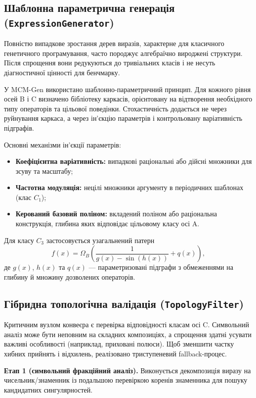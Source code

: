 \documentclass[11pt]{article}
\begin{document}
\subsection{Шаблонна параметрична генерація (\texttt{ExpressionGenerator})}

Повністю випадкове зростання дерев виразів, характерне для класичного генетичного програмування, часто породжує алгебраїчно вироджені структури. Після спрощення вони редукуються до тривіальних класів і не несуть діагностичної цінності для бенчмарку.

У MCM-Gen використано шаблонно-параметричний принцип. Для кожного рівня осей B і C визначено бібліотеку каркасів, орієнтовану на відтворення необхідного типу операторів та цільової поведінки. Стохастичність додається не через руйнування каркаса, а через ін'єкцію параметрів і контрольовану варіативність підграфів.

Основні механізми ін'єкції параметрів:
\begin{itemize}[leftmargin=1.5em]
  \item \textbf{Коефіцієнтна варіативність:} випадкові раціональні або дійсні множники для зсуву та масштабу;
  \item \textbf{Частотна модуляція:} нецілі множники аргументу в періодичних шаблонах (клас $C_1$);
  \item \textbf{Керований базовий поліном:} вкладений поліном або раціональна конструкція, глибина яких відповідає цільовому класу осі A.
\end{itemize}

Для класу $C_3$ застосовується узагальнений патерн
\[
f(x)=\Omega_B\!\left(\frac{1}{g(x)-\sin(h(x))}+q(x)\right),
\]
де $g(x)$, $h(x)$ та $q(x)$ --- параметризовані підграфи з обмеженнями на глибину й множину дозволених операторів.

\subsection{Гібридна топологічна валідація (\texttt{TopologyFilter})}

Критичним вузлом конвеєра є перевірка відповідності класам осі C. Символьний аналіз може бути неповним на складних композиціях, а спрощення здатні усувати важливі особливості (наприклад, приховані полюси). Щоб зменшити частку хибних прийнять і відхилень, реалізовано триступеневий fallback-процес.

\textbf{Етап 1 (символьний фракційний аналіз).}
Виконується декомпозиція виразу на чисельник/знаменник із подальшою перевіркою коренів знаменника для пошуку кандидатних сингулярностей.
\end{document}

